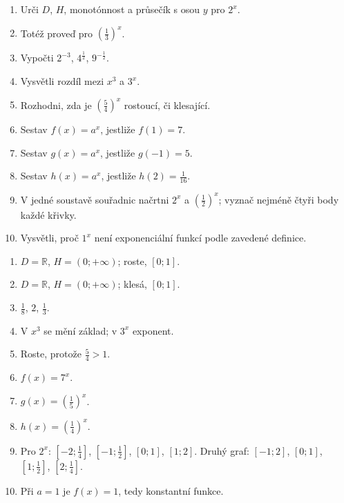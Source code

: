 \documentclass[11pt,a4paper]{article}
\begin{document}
\clearpage
\begin{zadaniReseniBox}[title={Domácí úkol}]
\begin{enumerate}[label=\alph*)]
\item Urči $D$, $H$, monotónnost a průsečík s osou $y$ pro $2^x$.
\item Totéž proveď pro $\left(\frac{1}{3}\right)^x$.
\item Vypočti $2^{-3}$, $4^{\frac{1}{2}}$, $9^{-\frac{1}{2}}$.
\item Vysvětli rozdíl mezi $x^3$ a $3^x$.
\item Rozhodni, zda je $\left(\frac{5}{4}\right)^x$ rostoucí, či klesající.
\item Sestav $f(x)=a^x$, jestliže $f(1)=7$.
\item Sestav $g(x)=a^x$, jestliže $g(-1)=5$.
\item Sestav $h(x)=a^x$, jestliže $h(2)=\frac{1}{16}$.
\item V jedné soustavě souřadnic načrtni $2^x$ a $\left(\frac{1}{2}\right)^x$; vyznač nejméně čtyři body každé křivky.
\item Vysvětli, proč $1^x$ není exponenciální funkcí podle zavedené definice.
\end{enumerate}
\tcblower
\begin{enumerate}[label=\alph*)]
\item $D=\mathbb R$, $H=(0;+\infty)$; roste, $[0;1]$.
\item $D=\mathbb R$, $H=(0;+\infty)$; klesá, $[0;1]$.
\item $\frac{1}{8}$, $2$, $\frac{1}{3}$.
\item V $x^3$ se mění základ; v $3^x$ exponent.
\item Roste, protože $\frac{5}{4}>1$.
\item $f(x)=7^x$.
\item $g(x)=\left(\frac{1}{5}\right)^x$.
\item $h(x)=\left(\frac{1}{4}\right)^x$.
\item Pro $2^x$: $[-2;\frac{1}{4}]$, $[-1;\frac{1}{2}]$, $[0;1]$, $[1;2]$. Druhý graf: $[-1;2]$, $[0;1]$, $[1;\frac{1}{2}]$, $[2;\frac{1}{4}]$.
\item Při $a=1$ je $f(x)=1$, tedy konstantní funkce.
\end{enumerate}
\end{zadaniReseniBox}
\end{document}
